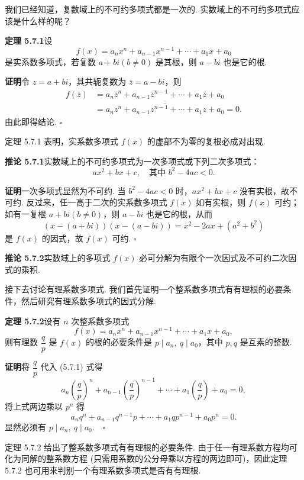 \documentclass[UTF8, 12pt, fontset=fandol, oneside]{ctexart}
\begin{document}
我们已经知道，复数域上的不可约多项式都是一次的. 实数域上的不可约多项式应该是什么样的呢？

\noindent\textbf{定理 5.7.1}\quad 设
\[
f(x)=a_nx^n+a_{n-1}x^{n-1}+\cdots+a_1x+a_0
\]
是实系数多项式，若复数 $a+bi(b\neq 0)$ 是其根，则 $a-bi$ 也是它的根.

\noindent\textbf{证明}\quad 令 $z=a+bi$，其共轭复数为 $\bar z=a-bi$，则
\[
\begin{aligned}
f(\bar z)&=a_n\bar z^n+a_{n-1}\bar z^{n-1}+\cdots+a_1\bar z+a_0\\
&=\overline{a_nz^n+a_{n-1}z^{n-1}+\cdots+a_1z+a_0}=0.
\end{aligned}
\]
由此即得结论. $\square$

定理 5.7.1 表明，实系数多项式 $f(x)$ 的虚部不为零的复根必成对出现.

\noindent\textbf{推论 5.7.1}\quad 实数域上的不可约多项式为一次多项式或下列二次多项式：
\[
ax^2+bx+c,\quad \text{其中 } b^2-4ac<0.
\]

\noindent\textbf{证明}\quad 一次多项式显然为不可约. 当 $b^2-4ac<0$ 时，$ax^2+bx+c$ 没有实根，故不可约. 反过来，任一高于二次的实系数多项式 $f(x)$ 如有实根，则 $f(x)$ 可约；如有一复根 $a+bi(b\neq 0)$，则 $a-bi$ 也是它的根，从而
\[
(x-(a+bi))(x-(a-bi))=x^2-2ax+(a^2+b^2)
\]
是 $f(x)$ 的因式，故 $f(x)$ 可约. $\square$

\noindent\textbf{推论 5.7.2}\quad 实数域上的多项式 $f(x)$ 必可分解为有限个一次因式及不可约二次因式的乘积.

接下去讨论有理系数多项式. 我们首先证明一个整系数多项式有有理根的必要条件，然后研究有理系数多项式的因式分解.

\noindent\textbf{定理 5.7.2}\quad 设有 $n$ 次整系数多项式
\begin{equation}
f(x)=a_nx^n+a_{n-1}x^{n-1}+\cdots+a_1x+a_0,
\tag{5.7.1}
\end{equation}
则有理数 $\dfrac q p$ 是 $f(x)$ 的根的必要条件是 $p\mid a_n,\ q\mid a_0$，其中 $p,q$ 是互素的整数.

\noindent\textbf{证明}\quad 将 $\dfrac q p$ 代入 (5.7.1) 式得
\[
a_n\left(\frac q p\right)^n+a_{n-1}\left(\frac q p\right)^{n-1}+\cdots+a_1\left(\frac q p\right)+a_0=0,
\]
将上式两边乘以 $p^n$ 得
\[
a_nq^n+a_{n-1}q^{n-1}p+\cdots+a_1qp^{n-1}+a_0p^n=0.
\]
显然必须有 $p\mid a_n,\ q\mid a_0.\quad \square$

定理 5.7.2 给出了整系数多项式有有理根的必要条件. 由于任一有理系数方程均可化为同解的整系数方程 (只需用系数的公分母乘以方程的两边即可)，因此定理 5.7.2 也可用来判别一个有理系数多项式是否有有理根.
\end{document}
